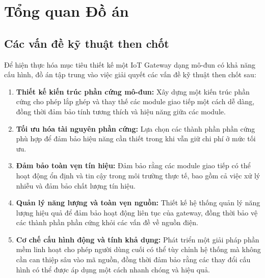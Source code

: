 \chapter{Tổng quan Đồ án}
    \section{Các vấn đề kỹ thuật then chốt}
        Để hiện thực hóa mục tiêu thiết kế một IoT Gateway dạng mô-đun có khả năng cấu hình, đồ án tập trung vào việc giải quyết các vấn đề kỹ thuật then chốt sau:
        \begin{enumerate}
            \item \textbf{Thiết kế kiến trúc phần cứng mô-đun:} Xây dựng một kiến trúc phần cứng cho phép lắp ghép và thay thế các module giao tiếp một cách dễ dàng, đồng thời đảm bảo tính tương thích và hiệu năng giữa các module.
            \item \textbf{Tối ưu hóa tài nguyên phần cứng:} Lựa chọn các thành phần phần cứng phù hợp để đảm bảo hiệu năng cần thiết trong khi vẫn giữ chi phí ở mức tối ưu.
            \item \textbf{Đảm bảo toàn vẹn tín hiệu:} Đảm bảo rằng các module giao tiếp có thể hoạt động ổn định và tin cậy trong môi trường thực tế, bao gồm cả việc xử lý nhiễu và đảm bảo chất lượng tín hiệu.
            \item \textbf{Quản lý năng lượng và toàn vẹn nguồn:} Thiết kế hệ thống quản lý năng lượng hiệu quả để đảm bảo hoạt động liên tục của gateway, đồng thời bảo vệ các thành phần phần cứng khỏi các vấn đề về nguồn điện.
            \item \textbf{Cơ chế cấu hình động và tính khả dụng:} Phát triển một giải pháp phần mềm linh hoạt cho phép người dùng cuối có thể tùy chỉnh hệ thống mà không cần can thiệp sâu vào mã nguồn, đồng thời đảm bảo rằng các thay đổi cấu hình có thể được áp dụng một cách nhanh chóng và hiệu quả.   
        \end{enumerate}

    
        
